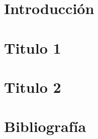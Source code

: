 \documentclass[12pt,spanish]{article}
\begin{document}
	
	\tableofcontents	
	\pagebreak
	


\section{Introducción}



\section{Titulo 1}

\newpage
\section{Titulo 2 }

\newpage




\newpage
\section{Bibliografía}



%





	
%	
%		
%		
%		
%		
%		
	
	
	
\end{document}
